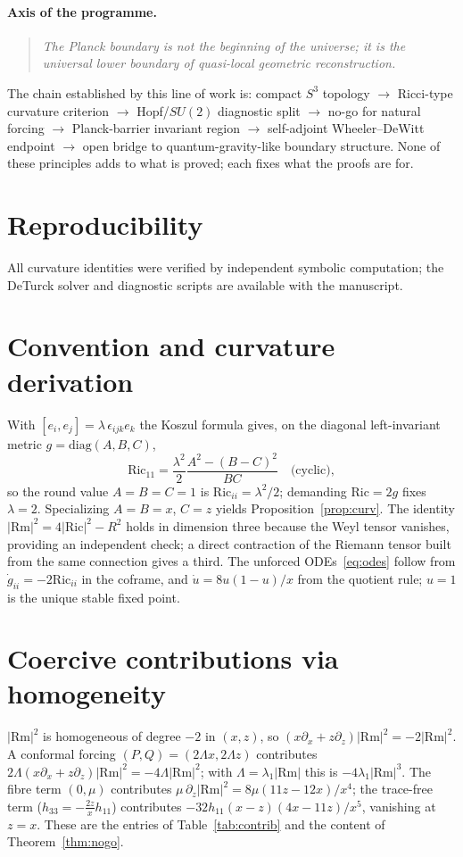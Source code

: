 \documentclass[aps,prd,twocolumn,superscriptaddress,nofootinbib,floatfix]{revtex4-2}
\theoremstyle{plain}
\theoremstyle{definition}
\newcommand{\Rm}{\mathrm{Rm}}
\newcommand{\Ric}{\mathrm{Ric}}
\begin{document}
\paragraph*{Axis of the programme.}
\begin{quote}
\emph{The Planck boundary is not the beginning of the universe; it is the universal lower boundary of quasi-local geometric reconstruction.}
\end{quote}
The chain established by this line of work is: compact $S^3$ topology $\to$ Ricci-type curvature criterion $\to$ Hopf/$SU(2)$ diagnostic split $\to$ no-go for natural forcing $\to$ Planck-barrier invariant region $\to$ self-adjoint Wheeler--DeWitt endpoint $\to$ open bridge to quantum-gravity-like boundary structure. None of these principles adds to what is proved; each fixes what the proofs are for.

\section*{Reproducibility}
All curvature identities were verified by independent symbolic computation; the DeTurck solver and diagnostic scripts are available with the manuscript.

\appendix

\section{Convention and curvature derivation}\label{app:conv}
With $[e_i,e_j]=\lambda\,\epsilon_{ijk}e_k$ the Koszul formula gives, on the diagonal left-invariant metric $g=\mathrm{diag}(A,B,C)$,
\[
\Ric_{11}=\frac{\lambda^2}{2}\frac{A^2-(B-C)^2}{BC}\quad\text{(cyclic)} ,
\]
so the round value $A=B=C=1$ is $\Ric_{ii}=\lambda^2/2$; demanding $\Ric=2g$ fixes $\lambda=2$. Specializing $A=B=x$, $C=z$ yields Proposition~\ref{prop:curv}. The identity $|\Rm|^2=4|\Ric|^2-R^2$ holds in dimension three because the Weyl tensor vanishes, providing an independent check; a direct contraction of the Riemann tensor built from the same connection gives a third. The unforced ODEs~\eqref{eq:odes} follow from $\dot g_{ii}=-2\Ric_{ii}$ in the coframe, and $\dot u=8u(1-u)/x$ from the quotient rule; $u=1$ is the unique stable fixed point.

\section{Coercive contributions via homogeneity}\label{app:euler}
$|\Rm|^2$ is homogeneous of degree $-2$ in $(x,z)$, so $(x\partial_x+z\partial_z)|\Rm|^2=-2|\Rm|^2$. A conformal forcing $(P,Q)=(2\Lambda x,2\Lambda z)$ contributes $2\Lambda(x\partial_x+z\partial_z)|\Rm|^2=-4\Lambda|\Rm|^2$; with $\Lambda=\lambda_1|\Rm|$ this is $-4\lambda_1|\Rm|^3$. The fibre term $(0,\mu)$ contributes $\mu\,\partial_z|\Rm|^2=8\mu(11z-12x)/x^4$; the trace-free term ($h_{33}=-\tfrac{2z}{x}h_{11}$) contributes $-32h_{11}(x-z)(4x-11z)/x^5$, vanishing at $z=x$. These are the entries of Table~\ref{tab:contrib} and the content of Theorem~\ref{thm:nogo}.
\end{document}
